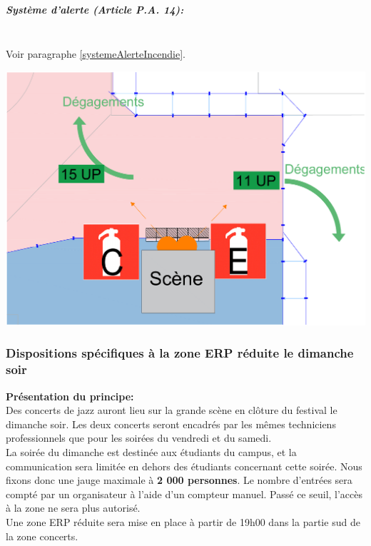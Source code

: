 \documentclass[hidelinks, paper=a4, fontsize=13pt]{report}
\begin{document}
\subparagraph*{Système d'alerte (Article P.A. 14):}\mbox{}\\

Voir paragraphe \ref{systemeAlerteIncendie}.

\begin{center}
	\includegraphics[width=.8\textwidth,keepaspectratio]{Exports/Plan_24h_44eme-3e_Scene_Secu_Incendie}
\end{center}

\newpage 

\subsubsection{Dispositions spécifiques à la zone ERP réduite le dimanche soir}

\textbf{Présentation du principe:}\\
Des concerts de jazz auront lieu sur la grande scène en clôture du festival le dimanche soir. Les deux concerts seront encadrés par les mêmes techniciens professionnels que pour les soirées du vendredi et du samedi.\\

La soirée du dimanche est destinée aux étudiants du campus, et la communication sera limitée en dehors des étudiants concernant cette soirée. Nous fixons donc une jauge maximale à \textbf{2 000 personnes}. Le nombre d'entrées sera compté par un organisateur à l'aide d'un compteur manuel. Passé ce seuil, l'accès à la zone ne sera plus autorisé.\\

Une zone ERP réduite sera mise en place à partir de 19h00 dans la partie sud de la zone concerts.\\
\end{document}
